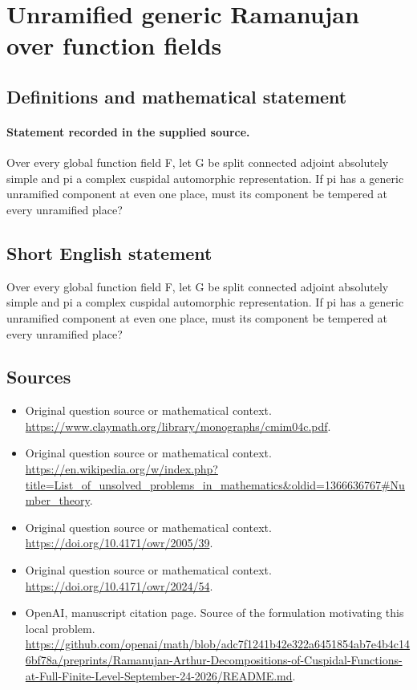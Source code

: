 \documentclass[11pt]{article}
\begin{document}
\section*{Unramified generic Ramanujan over function fields}\label{statement}
\subsection{Definitions and mathematical statement}
\paragraph{Statement recorded in the supplied source.}
Over every global function field F, let G be split connected adjoint absolutely simple and pi a complex cuspidal automorphic representation. If pi has a generic unramified component at even one place, must its component be tempered at every unramified place?
\subsection{Short English statement}
Over every global function field F, let G be split connected adjoint absolutely simple and pi a complex cuspidal automorphic representation. If pi has a generic unramified component at even one place, must its component be tempered at every unramified place?
\subsection{Sources}
\begin{itemize}
\item[S1] Original question source or mathematical context.
\url{https://www.claymath.org/library/monographs/cmim04c.pdf}.
\item[S2] Original question source or mathematical context.
\url{https://en.wikipedia.org/w/index.php?title=List_of_unsolved_problems_in_mathematics&oldid=1366636767#Number_theory}.
\item[S3] Original question source or mathematical context.
\url{https://doi.org/10.4171/owr/2005/39}.
\item[S4] Original question source or mathematical context.
\url{https://doi.org/10.4171/owr/2024/54}.
\item[S5] OpenAI, manuscript citation page. Source of the formulation motivating this local problem.
\url{https://github.com/openai/math/blob/adc7f1241b42e322a6451854ab7e4b4c146bf78a/preprints/Ramanujan-Arthur-Decompositions-of-Cuspidal-Functions-at-Full-Finite-Level-September-24-2026/README.md}.
\end{itemize}
\end{document}

